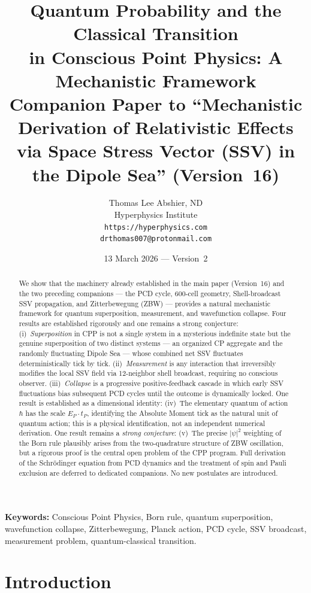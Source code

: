 \documentclass[12pt]{article}
\title{\textbf{Quantum Probability and the Classical Transition\\
in Conscious Point Physics: A Mechanistic Framework}\\[6pt]
{\large Companion Paper to ``Mechanistic Derivation of Relativistic Effects\\
via Space Stress Vector (SSV) in the Dipole Sea'' (Version~16)}}
\author{Thomas Lee Abshier, ND\\
Hyperphysics Institute\\
\texttt{https://hyperphysics.com}\\
\texttt{drthomas007@protonmail.com}}
\date{13 March 2026 --- Version~2}
\newcommand{\EP}{E_P}
\newcommand{\tP}{t_P}
\begin{document}
\maketitle

\noindent\textbf{Keywords:} Conscious Point Physics, Born rule, quantum
superposition, wavefunction collapse, Zitterbewegung, Planck action, PCD
cycle, SSV broadcast, measurement problem, quantum-classical transition.

\begin{abstract}
We show that the machinery already established in the main paper (Version~16)
and the two preceding companions --- the PCD cycle, 600-cell geometry,
Shell-broadcast SSV propagation, and Zitterbewegung (ZBW) --- provides a
natural mechanistic framework for quantum superposition, measurement, and
wavefunction collapse.  Four results are established rigorously and one
remains a strong conjecture:
(i)~\emph{Superposition} in CPP is not a single system in a mysterious
indefinite state but the genuine superposition of two distinct systems ---
an organized CP aggregate and the randomly fluctuating Dipole Sea --- whose
combined net SSV fluctuates deterministically tick by tick.
(ii)~\emph{Measurement} is any interaction that irreversibly modifies the
local SSV field via 12-neighbor shell broadcast, requiring no conscious
observer.
(iii)~\emph{Collapse} is a progressive positive-feedback cascade in which
early SSV fluctuations bias subsequent PCD cycles until the outcome is
dynamically locked.
One result is established as a dimensional identity:
(iv)~The elementary quantum of action $\hbar$ has the scale $\EP\cdot\tP$,
identifying the Absolute Moment tick as the natural unit of quantum action;
this is a physical identification, not an independent numerical derivation.
One result remains a \emph{strong conjecture}:
(v)~The precise $|\psi|^2$ weighting of the Born rule plausibly arises from
the two-quadrature structure of ZBW oscillation, but a rigorous proof is the
central open problem of the CPP program.
Full derivation of the Schr\"odinger equation from PCD dynamics and the
treatment of spin and Pauli exclusion are deferred to dedicated companions.
No new postulates are introduced.
\end{abstract}

\section{Introduction}
\label{sec:intro}
\end{document}
